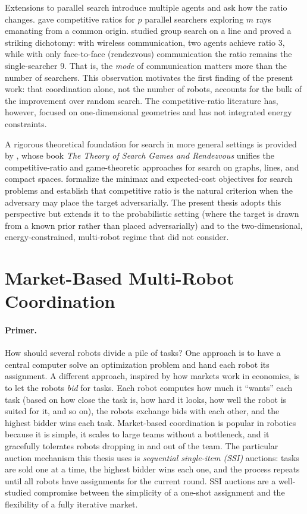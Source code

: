 \begin{doublespacing}
Extensions to parallel search introduce multiple agents and ask how
the ratio changes. \citet{LopezOrtiz2004} gave competitive ratios for
$p$ parallel searchers exploring $m$ rays emanating from a common
origin. \citet{Chrobak2015} studied group search on a line and proved a
striking dichotomy: with wireless communication, two agents achieve
ratio 3, while with only face-to-face (rendezvous) communication the
ratio remains the single-searcher 9. That is, the \emph{mode} of
communication matters more than the number of searchers. This
observation motivates the first finding of the present work: that
coordination alone, not the number of robots, accounts for the bulk of
the improvement over random search. The competitive-ratio literature
has, however, focused on one-dimensional geometries and has not
integrated energy constraints.

A rigorous theoretical foundation for search in more general settings
is provided by \citet{AlpernGal2003}, whose book \emph{The Theory of
Search Games and Rendezvous} unifies the competitive-ratio and
game-theoretic approaches for search on graphs, lines, and compact
spaces. \citeauthor{AlpernGal2003} formalize the minimax and expected-cost
objectives for search problems and establish that competitive ratio
is the natural criterion when the adversary may place the target
adversarially. The present thesis adopts this perspective but extends
it to the probabilistic setting (where the target is drawn from a known
prior rather than placed adversarially) and to the two-dimensional,
energy-constrained, multi-robot regime that
\citeauthor{AlpernGal2003} did not consider.

\section{Market-Based Multi-Robot Coordination}

\paragraph{Primer.} How should several robots divide a pile of
tasks? One approach is to have a central computer solve an
optimization problem and hand each robot its assignment. A different
approach, inspired by how markets work in economics, is to let the
robots \emph{bid} for tasks. Each robot computes how much it
``wants'' each task (based on how close the task is, how hard it
looks, how well the robot is suited for it, and so on), the robots
exchange bids with each other, and the highest bidder wins each
task. Market-based coordination is popular in robotics because it
is simple, it scales to large teams without a bottleneck, and it
gracefully tolerates robots dropping in and out of the team. The
particular auction mechanism this thesis uses is \emph{sequential
single-item (SSI)} auctions: tasks are sold one at a time, the
highest bidder wins each one, and the process repeats until all
robots have assignments for the current round. SSI auctions are a
well-studied compromise between the simplicity of a one-shot
assignment and the flexibility of a fully iterative market.


\end{doublespacing}
